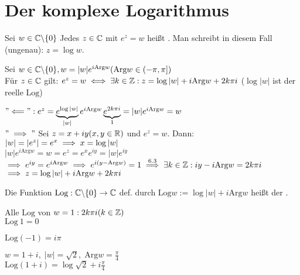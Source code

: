 \documentclass[a4paper,twoside,DIV15,BCOR12mm]{scrbook}
\def\gdw{\equizu}
\def\Arg{\text{Arg}}
\def\Log{\text{Log}}
\def\gdw{\equizu}
\begin{document}
\chapter{Der komplexe Logarithmus}

\begin{definition}
Sei $w \in \mathbb{C} \backslash\{0\}$ Jedes $z \in \mathbb{C}$ mit $e^z = w$ heißt . Man schreibt in diesem Fall (ungenau): $z = \log w$.
\end{definition}

\begin{satz} %
Sei $w \in \MdC\backslash\{0\}, w = |w|e^{i\Arg w} (\Arg w \in (-\pi , \pi])$ \\
Für $z \in \mathbb{C}$ gilt: $e^z = w \gdw \exists k \in \MdZ : z = \log |w| + i\Arg w + 2k\pi i$
($\log |w|$ ist der reelle $\Log$)
\end{satz}

\begin{beweis}
$"\Longleftarrow ": e^z = \underbrace{e^{\log|w|}}_{|w|} e^{i\Arg w}\underbrace{e^{2k\pi i}}_{1} = |w|e^{i\Arg w} = w$ \\
$"\implies "$ Sei $z = x + iy (x,y \in \mathbb{R})$ und $e^z = w$. Dann: $|w| = |e^z| = e^x \implies x = \log|w|$ \\
$|w|e^{i\Arg w} = w = e^z = e^xe^{iy} = |w| e^{iy}$ \\
$\folgt e^{iy} = e^{i\Arg w} \folgt e^{i(y-\Arg w)} = 1 \stackrel{6.3}{\folgt} \exists k \in \MdZ : iy - i\Arg w = 2k\pi i$ \\
$\folgt z = \log |w| + i\Arg w + 2k\pi i$
\end{beweis}

\begin{definition}
Die Funktion $\Log : \MdC \backslash\{0\}\rightarrow \MdC$ def. durch $\Log w := \log |w| + i\Arg w$ heißt der .
\end{definition}

\begin{beispiele}
\item Alle $\Log$ von $w = 1 : 2k\pi i (k \in \mathbb{Z})$ \\
$\Log \ 1 = 0$
\item $\Log (-1) = i\pi$
\item $w = 1+i, \; |w| = \sqrt 2, \; \Arg w = \frac{\pi}{4}$ \\
$\Log (1+i) = \log \sqrt 2 + i\frac{\pi}{4}$
\end{beispiele}

\newpage
\end{document}

